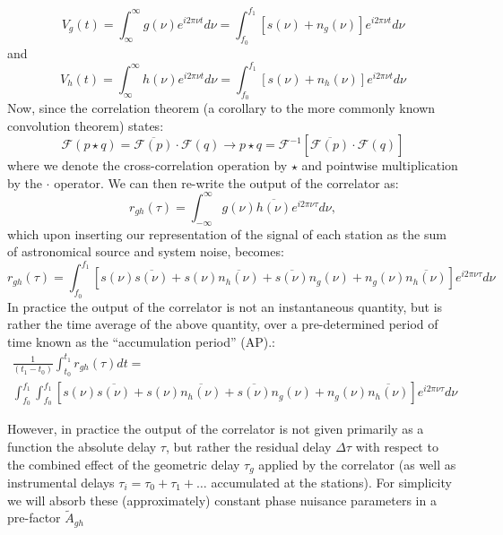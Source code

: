 \begin{equation}
 V_g(t) = \int_{\infty}^{\infty} g(\nu) e^{i 2\pi \nu t} d\nu = \int_{f_0}^{f_1} [s(\nu) + n_{g}(\nu)] e^{i 2\pi \nu t} d\nu 
\end{equation}
and 
\begin{equation}
  V_h(t) = \int_{\infty}^{\infty} h(\nu) e^{i 2\pi \nu t} d\nu =  \int_{f_0}^{f_1} [s(\nu) + n_{h}(\nu)] e^{i 2\pi \nu t} d\nu 
\end{equation}
Now, since the correlation theorem (a corollary to the more commonly known convolution theorem) states:
\begin{equation}
 \mathcal{F}(p \star q) = \overline{\mathcal{F}(p)} \cdot \mathcal{F}(q) \rightarrow
  p \star q = \mathcal{F}^{-1} \left [ \overline{\mathcal{F}(p)} \cdot \mathcal{F}(q) \right]
\end{equation}
where we denote the cross-correlation operation by $\star$ and pointwise multiplication by the $\cdot$ operator.
We can then re-write the output of the correlator as:
\begin{equation}
 r_{gh}(\tau) = \int_{-\infty}^{\infty}  g(\nu)  \overline{ h(\nu) } e^{i 2\pi \nu \tau} d\nu ,
\end{equation}
which upon inserting our representation of the signal of each station as the sum of astronomical source and system noise, becomes:
\begin{equation}
r_{gh}(\tau) = \int_{f_0}^{f_1} \left[ s(\nu)\overline{s(\nu)} + s(\nu)\overline{n_h(\nu)} + \overline{s(\nu)}n_g(\nu) + n_g(\nu)\overline{n_h(\nu)} \right]  e^{i 2\pi \nu \tau} d\nu
\end{equation}
In practice the output of the correlator is not an instantaneous quantity, but is rather the time average of the above quantity, over 
a pre-determined period of time known as the ``accumulation period'' (AP).:
\begin{multline}
 \frac{1}{(t_1 - t_0)} \int_{t_0}^{t_1} r_{gh}(\tau) dt = \\
 \int_{f_0}^{f_1} \int_{f_0}^{f_1} \left[ s(\nu)\overline{s(\nu)} + s(\nu)\overline{n_h(\nu)} + \overline{s(\nu)}n_g(\nu) + n_g(\nu)\overline{n_h(\nu)} \right]  e^{i 2\pi \nu \tau} d\nu
\end{multline}


However, in practice the output of the correlator is not given primarily as a function the absolute delay $\tau$, 
but rather the residual delay $\Delta \tau$ with respect to the combined effect of the geometric delay $\tau_g$ applied by the correlator (as well as instrumental delays $\tau_i = \tau_0 + \tau_1 + \dots$ accumulated at the stations). For simplicity we
will absorb these (approximately) constant phase nuisance parameters in a pre-factor $\tilde{A}_{gh}$



